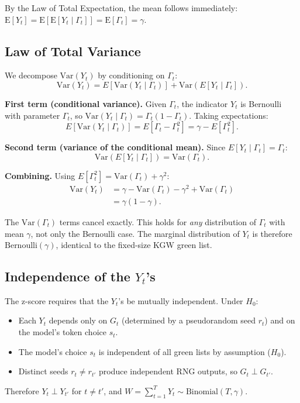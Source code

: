 \documentclass[11pt]{article}
\begin{document}
By the Law of Total Expectation, the mean follows immediately: $\mathrm{E}[Y_t] = \mathrm{E}[\mathrm{E}[Y_t \mid \Gamma_t]] = \mathrm{E}[\Gamma_t] = \gamma$.

\subsection{Law of Total Variance}

We decompose $\mathrm{Var}(Y_t)$ by conditioning on $\Gamma_t$:
\begin{equation}
\mathrm{Var}(Y_t) = E[\mathrm{Var}(Y_t \mid \Gamma_t)] + \mathrm{Var}(E[Y_t \mid \Gamma_t]).
\end{equation}

\textbf{First term (conditional variance).} Given $\Gamma_t$, the indicator $Y_t$ is Bernoulli with parameter $\Gamma_t$, so $\mathrm{Var}(Y_t \mid \Gamma_t) = \Gamma_t(1 - \Gamma_t)$. Taking expectations:
\begin{equation}
E[\mathrm{Var}(Y_t \mid \Gamma_t)] = E[\Gamma_t - \Gamma_t^2] = \gamma - E[\Gamma_t^2].
\end{equation}

\textbf{Second term (variance of the conditional mean).} Since $E[Y_t \mid \Gamma_t] = \Gamma_t$:
\begin{equation}
\mathrm{Var}(E[Y_t \mid \Gamma_t]) = \mathrm{Var}(\Gamma_t).
\end{equation}

\textbf{Combining.} Using $E[\Gamma_t^2] = \mathrm{Var}(\Gamma_t) + \gamma^2$:
\begin{align}
\mathrm{Var}(Y_t) &= \gamma - \mathrm{Var}(\Gamma_t) - \gamma^2 + \mathrm{Var}(\Gamma_t) \nonumber\\
                   &= \gamma(1 - \gamma).
\end{align}

The $\mathrm{Var}(\Gamma_t)$ terms cancel exactly. This holds for \emph{any} distribution of $\Gamma_t$ with mean $\gamma$, not only the Bernoulli case. The marginal distribution of $Y_t$ is therefore $\text{Bernoulli}(\gamma)$, identical to the fixed-size KGW green list.

\subsection{Independence of the $Y_t$'s}

The z-score requires that the $Y_t$'s be mutually independent. Under $H_0$:
\begin{itemize}
\item Each $Y_t$ depends only on $G_t$ (determined by a pseudorandom seed $r_t$) and on the model's token choice $s_t$.
\item The model's choice $s_t$ is independent of all green lists by assumption ($H_0$).
\item Distinct seeds $r_t \neq r_{t'}$ produce independent RNG outputs, so $G_t \perp G_{t'}$.
\end{itemize}
Therefore $Y_t \perp Y_{t'}$ for $t \neq t'$, and $W = \sum_{t=1}^T Y_t \sim \text{Binomial}(T, \gamma)$.
\end{document}
